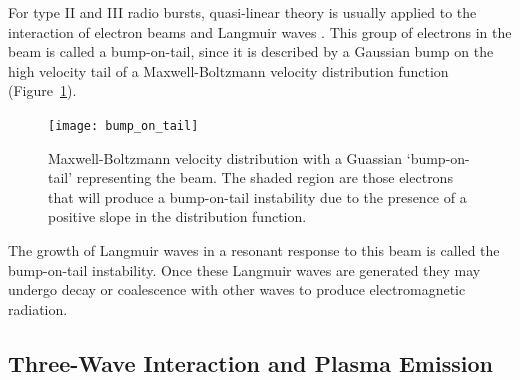 For type II and III radio bursts, quasi-linear theory is usually applied to the interaction of electron beams and Langmuir waves \citep{kontar2001, reid2010, ratcliffe2012}. This group of electrons in the beam is called a bump-on-tail, since it is described by a Gaussian bump on the high velocity tail of a Maxwell-Boltzmann velocity distribution function (Figure~\ref{fig:bot}). 
\begin{figure}[!t] 
\begin{center}
\texttt{[image: bump\_on\_tail]}
\caption[Shock drift acceleration]{Maxwell-Boltzmann velocity distribution with a Guassian `bump-on-tail' representing the beam. The shaded region are those electrons that will produce a bump-on-tail instability due to the presence of a positive slope in the distribution function.}
\label{fig:bot}
\end{center}
\end{figure}
The growth of Langmuir waves in a resonant response to this beam is called the bump-on-tail instability. Once these Langmuir waves are generated they may undergo decay or coalescence with other waves to produce electromagnetic radiation. 


\subsection{Three-Wave Interaction and Plasma Emission}\label{sec:three_wave}

